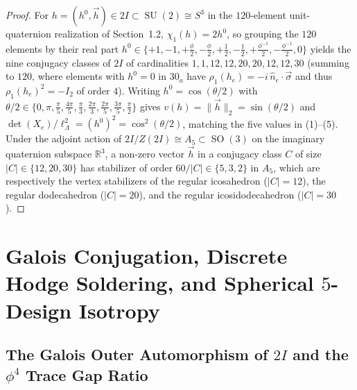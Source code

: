 \documentclass[11pt,a4paper]{article}
\theoremstyle{definition}
\theoremstyle{remark}
\newcommand{\R}{\mathbb{R}}
\newcommand{\SU}{\operatorname{SU}}
\newcommand{\SO}{\operatorname{SO}}
\begin{document}
\begin{proof}
For $h = (h^0, \vec{h}) \in 2I \subset \SU(2) \cong S^3$ in the $120$-element unit-quaternion realization of Section~1.2, $\chi_1(h) = 2 h^0$, so grouping the $120$ elements by their real part $h^0 \in \{+1, -1, +\frac{\phi}{2}, -\frac{\phi}{2}, +\frac{1}{2}, -\frac{1}{2}, +\frac{\phi^{-1}}{2}, -\frac{\phi^{-1}}{2}, 0\}$ yields the nine conjugacy classes of $2I$ of cardinalities $1, 1, 12, 12, 20, 20, 12, 12, 30$ (summing to $120$, where elements with $h^0 = 0$ in $30_a$ have $\rho_1(h_e) = -i\,\hat{n}_e\cdot\vec{\sigma}$ and thus $\rho_1(h_e)^2 = -I_2$ of order $4$). Writing $h^0 = \cos(\theta/2)$ with $\theta/2 \in \{0, \pi, \frac{\pi}{5}, \frac{4\pi}{5}, \frac{\pi}{3}, \frac{2\pi}{3}, \frac{2\pi}{5}, \frac{3\pi}{5}, \frac{\pi}{2}\}$ gives $v(h) = \|\vec{h}\|_2 = \sin(\theta/2)$ and $\det(X_e)/\ell_\Lambda^2 = (h^0)^2 = \cos^2(\theta/2)$, matching the five values in (1)--(5). Under the adjoint action of $2I / Z(2I) \cong A_5 \subset \SO(3)$ on the imaginary quaternion subspace $\R^3$, a non-zero vector $\vec{h}$ in a conjugacy class $C$ of size $|C| \in \{12, 20, 30\}$ has stabilizer of order $60 / |C| \in \{5, 3, 2\}$ in $A_5$, which are respectively the vertex stabilizers of the regular icosahedron ($|C|=12$), the regular dodecahedron ($|C|=20$), and the regular icosidodecahedron ($|C|=30$).
\end{proof}

\section{Galois Conjugation, Discrete Hodge Soldering, and Spherical \texorpdfstring{$5$-Design}{5-Design} Isotropy}
\label{sec:math_theorems}

\subsection{The Galois Outer Automorphism of \texorpdfstring{$2I$}{2I} and the \texorpdfstring{$\phi^4$}{phi\^{}4} Trace Gap Ratio}
\end{document}
